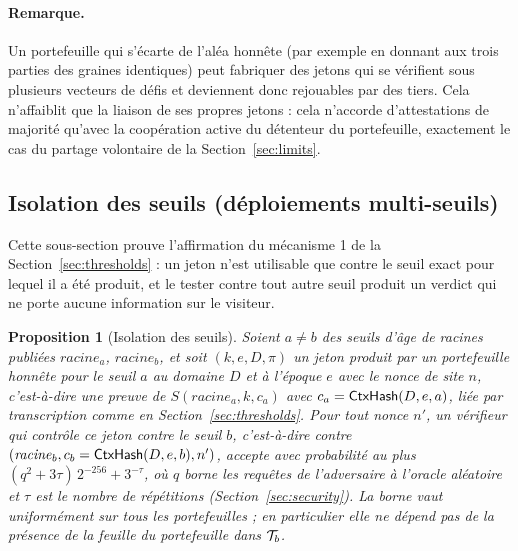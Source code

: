\documentclass[11pt]{article}
\newtheorem{proposition}{Proposition}
\theoremstyle{definition}
\begin{document}
\paragraph{Remarque.} Un portefeuille qui s'écarte de l'aléa honnête (par exemple en
donnant aux trois parties des graines identiques) peut fabriquer des jetons qui se
vérifient sous plusieurs vecteurs de défis et deviennent donc rejouables par des tiers.
Cela n'affaiblit que la liaison de ses propres jetons : cela n'accorde d'attestations de
majorité qu'avec la coopération active du détenteur du portefeuille, exactement le cas du
partage volontaire de la Section~\ref{sec:limits}.

\subsection{Isolation des seuils (déploiements multi-seuils)}
\label{sec:isolation}

Cette sous-section prouve l'affirmation du mécanisme 1 de la
Section~\ref{sec:thresholds} : un jeton n'est utilisable que contre le seuil exact pour
lequel il a été produit, et le tester contre tout autre seuil produit un verdict qui ne
porte aucune information sur le visiteur.

\begin{proposition}[Isolation des seuils]
\label{prop:isolation}
Soient $a \ne b$ des seuils d'âge de racines publiées $\mathit{racine}_a$,
$\mathit{racine}_b$, et soit $(k, e, D, \pi)$ un jeton produit par un portefeuille
honnête pour le seuil $a$ au domaine $D$ et à l'époque $e$ avec le nonce de site $n$,
c'est-à-dire une preuve de $S(\mathit{racine}_a, k, c_a)$ avec $c_a = \mathsf{CtxHash}(D, e, a)$,
liée par transcription comme en Section~\ref{sec:thresholds}. Pour tout nonce $n'$, un
vérifieur qui contrôle ce jeton contre le seuil $b$, c'est-à-dire contre
$(\mathit{racine}_b, c_b = \mathsf{CtxHash}(D, e, b), n')$, accepte avec probabilité au plus
$(q^2 + 3\tau)\,2^{-256} + 3^{-\tau}$, où $q$ borne les requêtes de l'adversaire à
l'oracle aléatoire et $\tau$ est le nombre de répétitions (Section~\ref{sec:security}).
La borne vaut uniformément sur tous les portefeuilles ; en particulier elle ne dépend pas
de la présence de la feuille du portefeuille dans $\mathcal{T}_b$.
\end{proposition}
\end{document}
